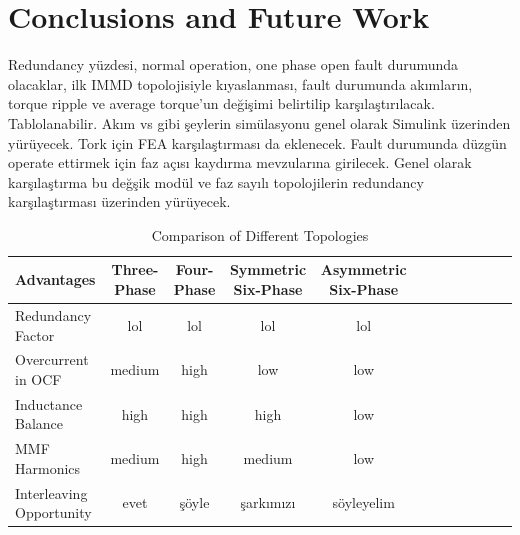 \documentclass[a4paper,11pt]{article}
\begin{document}
\section{\normalsize\textbf{Conclusions and Future Work}}
Redundancy yüzdesi, normal operation, one phase open fault durumunda olacaklar, ilk IMMD topolojisiyle kıyaslanması, fault durumunda akımların, torque ripple ve average torque'un değişimi belirtilip karşılaştırılacak. Tablolanabilir. Akım vs gibi şeylerin simülasyonu genel olarak Simulink üzerinden yürüyecek. Tork için FEA karşılaştırması da eklenecek. Fault durumunda düzgün operate ettirmek için faz açısı kaydırma mevzularına girilecek. Genel olarak karşılaştırma bu değşik modül ve faz sayılı topolojilerin redundancy karşılaştırması üzerinden yürüyecek. 

\begin{table}[ht!]
 \caption{Comparison of Different Topologies}
\label{kd}
\begin{tabularx}{\textwidth}{@{}l*{10}{C}c@{}}
\toprule
Advantages      & Three-Phase  & Four-Phase & Symmetric Six-Phase & Asymmetric Six-Phase \\ 
\midrule
Redundancy Factor    & lol    & lol    & lol   & lol \\ 
Overcurrent in OCF   & medium    & high  & low    & low \\ 
Inductance Balance  &  high &   high &    high &  low\\
MMF Harmonics  & medium    & high  & medium  & low  \\ 
Interleaving Opportunity  & evet  & şöyle   & şarkımızı   & söyleyelim  \\


\bottomrule
\end{tabularx}
\end{table}

\AtNextBibliography{\tiny}
\printbibliography
\end{document}
